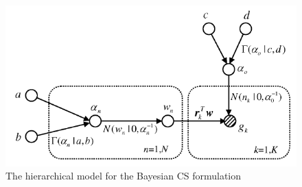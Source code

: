 \begin{figure}[h]
\centering
\includegraphics[height = 7 cm]{bayesiancs.png}
\caption{The hierarchical model for the Bayesian CS formulation \cite{Ji2008}}
\label{bayesiancs}
\end{figure}